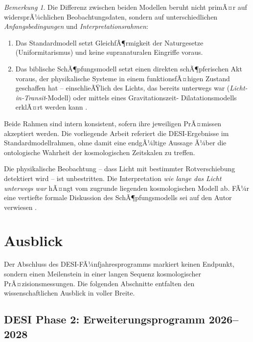 ﻿\documentclass[a4paper,12pt]{article}
\theoremstyle{definition}
\theoremstyle{remark}
\newtheorem{bemerkung}{Bemerkung}[section]
\begin{document}
\begin{bemerkung}
  Die Differenz zwischen beiden Modellen beruht nicht primÃ¤r auf
  widersprÃ¼chlichen Beobachtungsdaten, sondern auf unterschiedlichen
  \textit{Anfangsbedingungen} und \textit{Interpretationsrahmen}:
  \begin{enumerate}[label=\arabic*.]
    \item Das Standardmodell setzt GleichfÃ¶rmigkeit der Naturgesetze (Uniformitarismus)
      und keine supranaturalen Eingriffe voraus.
    \item Das biblische SchÃ¶pfungsmodell setzt einen direkten schÃ¶pferischen Akt
      voraus, der physikalische Systeme in einem funktionsfÃ¤higen Zustand
      geschaffen hat -- einschlieÃŸlich des Lichts, das bereits unterwegs war
      (\textit{Licht-in-Transit}-Modell) oder mittels eines Gravitationszeit-
      Dilatationsmodells erklÃ¤rt werden kann \cite{humphreys1994}.
  \end{enumerate}
  Beide Rahmen sind intern konsistent, sofern ihre jeweiligen PrÃ¤missen
  akzeptiert werden. Die vorliegende Arbeit referiert die DESI-Ergebnisse im
  Standardmodellrahmen, ohne damit eine endgÃ¼ltige Aussage Ã¼ber die ontologische
  Wahrheit der kosmologischen Zeitskalen zu treffen.
\end{bemerkung}

Die physikalische Beobachtung -- dass Licht mit bestimmter Rotverschiebung
detektiert wird -- ist unbestritten. Die Interpretation \textit{wie lange das
Licht unterwegs war} hÃ¤ngt vom zugrunde liegenden kosmologischen Modell ab.
FÃ¼r eine vertiefte formale Diskussion des SchÃ¶pfungsmodells sei auf den
Autor verwiesen \cite{eppgenesis2026}.

\section{Ausblick}
\label{sec:ausblick}

Der Abschluss des DESI-FÃ¼nfjahresprogramms markiert keinen Endpunkt, sondern
einen Meilenstein in einer langen Sequenz kosmologischer PrÃ¤zisionsmessungen.
Die folgenden Abschnitte entfalten den wissenschaftlichen Ausblick in voller
Breite.

\subsection{DESI Phase 2: Erweiterungsprogramm 2026--2028}
\end{document}
